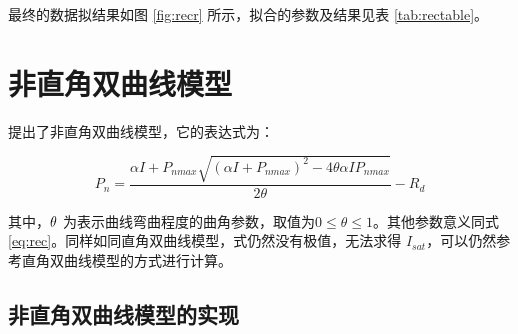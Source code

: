 \documentclass[]{krantz}
\theoremstyle{definition}
\theoremstyle{definition}
\theoremstyle{definition}
\theoremstyle{remark}
\begin{document}
最终的数据拟结果如图 \ref{fig:recr} 所示，拟合的参数及结果见表
\ref{tab:rectable}。

\cleardoublepage

\section{非直角双曲线模型}

\citet{Thornley1976} 提出了非直角双曲线模型，它的表达式为：

\begin{equation}
P_{n} = \frac{\alpha I + P_{nmax} \sqrt{(\alpha I + P_{nmax})^{2} - 4  \theta \alpha I P_{nmax}}}{2 \theta} - R_{d}
\label{eq:nrec}
\end{equation}

其中，\(\text{\ensuremath{\theta}}\)
为表示曲线弯曲程度的曲角参数，取值为\(0\leq \theta \leq 1\)。其他参数意义同式
\eqref{eq:rec}。同样如同直角双曲线模型，式仍然没有极值，无法求得
\(I_{sat}\)，可以仍然参考直角双曲线模型的方式进行计算。

\subsection{非直角双曲线模型的实现}
\end{document}
